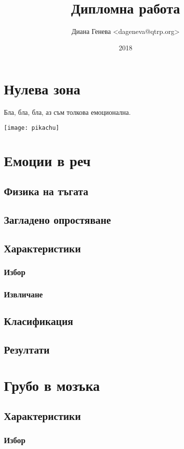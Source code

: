 \documentclass[12pt]{report}
\title{Дипломна работа}
\author{Диана Генева <dageneva@qtrp.org>}
\date{2018}
\begin{document}
\maketitle
\thispagestyle{empty}
\tableofcontents
\pagebreak

\chapter{Нулева зона}
Бла, бла, бла, аз съм толкова емоционална.

\texttt{[image: pikachu]}

\chapter{Емоции в реч}
    \section{Физика на тъгата}
    \section{Загладено опростяване}    
    \section{Характеристики}
        \subsection{Избор}
        \subsection{Извличане}
    \section{Класификация}    
    \section{Резултати}

\chapter{Грубо в мозъка}
    \section{Характеристики}
        \subsection{Избор}
\end{document}
